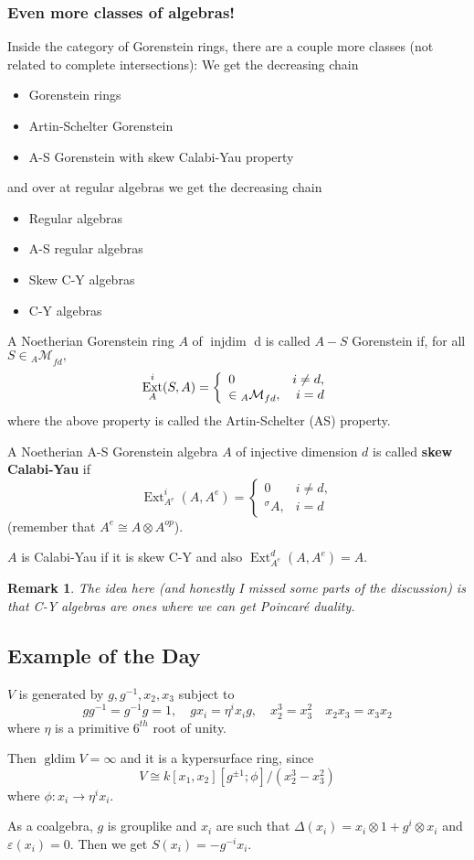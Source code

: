 \documentclass[12pt]{article}
\theoremstyle{break}
\theoremstyle{nonumberbreak}
\theoremstyle{changebreak}
\theoremstyle{break}
\theoremstyle{nonumberbreak}
\theoremstyle{nonumberplain}
\theoremstyle{change}
\newtheorem{rmk}[thm]{Remark}
\DeclareMathOperator{\Ext}{Ext}
\DeclareMathOperator{\gldim}{gldim}
\DeclareMathOperator{\injdim}{injdim}
\newcommand*{\calM}{\mathcal{M}}
\begin{document}
\subsubsection{Even more classes of algebras!}
Inside the category of Gorenstein rings, there are a couple more classes (not related to complete intersections):
We get the decreasing chain
\begin{itemize}
	\item Gorenstein rings
	\item Artin-Schelter Gorenstein
	\item A-S Gorenstein with skew Calabi-Yau property
\end{itemize}
and over at regular algebras we get the decreasing chain
\begin{itemize}
	\item Regular algebras
	\item A-S regular algebras
	\item Skew C-Y algebras
	\item C-Y algebras
\end{itemize}
\begin{defn}
	A Noetherian Gorenstein ring $A$ of $\injdim$ d is called $A-S$ Gorenstein if, for all $S\in{_A\calM}_{fd},$
	\[\Ext_A^i(S,A)=\left\{\begin{array}{lr}0 & i\ne d,\\ \in {_A\cal M}_{fd}, & i=d\end{array}\right.\]
	where the above property is called the Artin-Schelter (AS) property.
\end{defn}
\begin{defn}
	A Noetherian A-S Gorenstein algebra $A$ of injective dimension $d$ is called \textbf{skew Calabi-Yau} if
	\[\Ext_{A^e}^i(A,A^e)=\left\{\begin{array}{lr}0 & i\ne d,\\ {^\sigma A}, & i=d\end{array}\right.\]
	(remember that $A^e\cong A\otimes A^{op}$).
\end{defn}
\begin{defn}
	$A$ is Calabi-Yau if it is skew C-Y and also $\Ext_{A^e}^d(A,A^e)=A$.
\end{defn}
\begin{rmk}
	The idea here (and honestly I missed some parts of the discussion) is that C-Y algebras are ones where we can get 
	Poincar\'e duality.
\end{rmk}
\subsection{Example of the Day}
\begin{ex}
	$V$ is generated by $g,g^{-1},x_2,x_3$ subject to
	\[gg^{-1}=g^{-1}g=1,\quad gx_i=\eta^ix_i g,\quad x_2^3=x_3^2\quad x_2x_3=x_3x_2\]
	where $\eta$ is a primitive $6^{th}$ root of unity.

	Then $\gldim V=\infty$ and it is a kypersurface ring, since
	\[V\cong k[x_1,x_2][g^{\pm 1};\phi]/(x_2^3-x_3^2)\]
	where $\phi:x_i\to \eta^ix_i$.

	As a coalgebra, $g$ is grouplike and $x_i$ are such that $\Delta(x_i)=x_i\otimes 1+g^i\otimes x_i$
	and $\varepsilon(x_i)=0$. Then we get $S(x_i)=-g^{-i}x_i.$
\end{ex}
\end{document}

